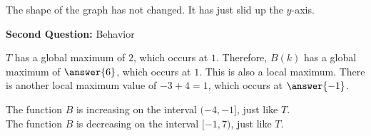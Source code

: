 \documentclass{ximera}
\begin{document}
The shape of the graph has not changed.  It has just slid up the $y$-axis.



\textbf{Second Question:} Behavior


$T$ has a global maximum of $2$, which occurs at $1$.  Therefore, $B(k)$ has a global maximum of $\answer{6}$, which occurs at $1$.  This is also a local maximum.  There is another local maximum value of $-3+4=1$, which occurs at $\answer{-1}$.

The function $B$ is increasing on the interval $(-4,-1]$, just like $T$. \\
The function $B$ is decreasing on the interval $[-1, 7)$, just like $T$.
\end{document}
